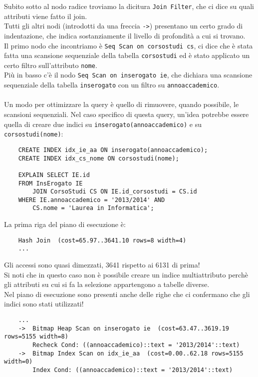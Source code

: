 \documentclass[12pt,a4paper]{book}
\begin{document}
	Subito sotto al nodo radice troviamo la dicitura \texttt{Join Filter}, che ci dice su quali attributi viene fatto il join.\\
	Tutti gli altri nodi (introdotti da una freccia \texttt{->}) presentano un certo grado di indentazione, che indica sostanziamente il livello di profondità a cui si trovano. \\Il primo nodo che incontriamo è \texttt{Seq Scan on corsostudi cs}, ci dice che è stata fatta una scansione sequenziale della tabella \texttt{corsostudi} ed è stato applicato un certo filtro sull'attributo \texttt{nome}.\\ Più in basso c'è il nodo \texttt{Seq Scan on inserogato ie}, che dichiara una scansione sequenziale della tabella \texttt{inserogato} con un filtro su \texttt{annoaccademico}.
	\paragraph{}Un modo per ottimizzare la query è quello di rimuovere, quando possibile, le scansioni sequenziali. Nel caso specifico di questa query, un'idea potrebbe essere quella di creare due indici su \texttt{inserogato(annoaccademico)} e su \texttt{corsostudi(nome)}:
	\begin{lstlisting}
	CREATE INDEX idx_ie_aa ON inserogato(annoaccademico);
	CREATE INDEX idx_cs_nome ON corsostudi(nome);
	
	EXPLAIN SELECT IE.id
	FROM InsErogato IE
		JOIN CorsoStudi CS ON IE.id_corsostudi = CS.id
	WHERE IE.annoaccademico = '2013/2014' AND 
		CS.nome = 'Laurea in Informatica';	
	\end{lstlisting}
	La prima riga del piano di esecuzione è:
	\begin{lstlisting}
	Hash Join  (cost=65.97..3641.10 rows=8 width=4)
	...
	\end{lstlisting}
	Gli accessi sono quasi dimezzati, 3641 rispetto ai 6131 di prima! \\Si noti che in questo caso non è possibile creare un indice multiattributo perchè gli attributi su cui si fa la selezione appartengono a tabelle diverse.\\
	Nel piano di esecuzione sono presenti anche delle righe che ci confermano che gli indici sono stati utilizzati!
	\begin{lstlisting}
	...
	->  Bitmap Heap Scan on inserogato ie  (cost=63.47..3619.19 rows=5155 width=8)
		Recheck Cond: ((annoaccademico)::text = '2013/2014'::text)
	->  Bitmap Index Scan on idx_ie_aa  (cost=0.00..62.18 rows=5155 width=0)
		Index Cond: ((annoaccademico)::text = '2013/2014'::text)
	\end{lstlisting}
\end{document}
